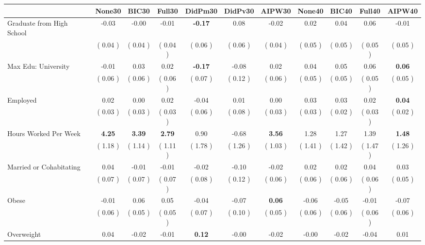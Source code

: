 \begin{tabular}{l c c c c c c c c c c}
\toprule
 & None30 & BIC30 & Full30 & DidPm30 & DidPv30 & AIPW30 & None40 & BIC40 & Full40 & AIPW40 \\
\midrule
Graduate from High School &     -0.03 &     -0.00 &     -0.01 & \textbf{     -0.17 } &      0.08 &     -0.02 &      0.02 &      0.04 &      0.06 &     -0.01 \\
& (     0.04 ) & (     0.04 ) & (     0.04 ) & (     0.06 ) & (     0.06 ) & (     0.04 ) & (     0.05 ) & (     0.05 ) & (     0.05 ) & (     0.05 ) \\
Max Edu: University &     -0.01 &      0.03 &      0.02 & \textbf{     -0.17 } &     -0.08 &      0.02 &      0.04 &      0.05 &      0.06 & \textbf{     0.06} \\
& (     0.06 ) & (     0.06 ) & (     0.06 ) & (     0.07 ) & (     0.12 ) & (     0.06 ) & (     0.05 ) & (     0.05 ) & (     0.05 ) & (     0.05 ) \\
Employed &      0.02 &      0.00 &      0.02 &     -0.04 &      0.01 &      0.00 &      0.03 &      0.03 &      0.02 & \textbf{     0.04} \\
& (     0.03 ) & (     0.03 ) & (     0.03 ) & (     0.06 ) & (     0.08 ) & (     0.03 ) & (     0.03 ) & (     0.02 ) & (     0.03 ) & (     0.02 ) \\
Hours Worked Per Week & \textbf{      4.25 } & \textbf{      3.39 } & \textbf{      2.79 } &      0.90 &     -0.68 & \textbf{     3.56} &      1.28 &      1.27 &      1.39 & \textbf{     1.48} \\
& (     1.18 ) & (     1.14 ) & (     1.11 ) & (     1.78 ) & (     1.26 ) & (     1.03 ) & (     1.41 ) & (     1.42 ) & (     1.47 ) & (     1.26 ) \\
Married or Cohabitating &      0.04 &     -0.01 &     -0.01 &     -0.02 &     -0.10 &     -0.02 &      0.02 &      0.02 &      0.04 &      0.03 \\
& (     0.07 ) & (     0.07 ) & (     0.07 ) & (     0.08 ) & (     0.12 ) & (     0.06 ) & (     0.06 ) & (     0.06 ) & (     0.06 ) & (     0.05 ) \\
Obese &     -0.01 &      0.06 &      0.05 &     -0.04 &     -0.07 & \textbf{     0.06} &     -0.06 &     -0.05 &     -0.01 &     -0.07 \\
& (     0.06 ) & (     0.05 ) & (     0.05 ) & (     0.07 ) & (     0.10 ) & (     0.05 ) & (     0.06 ) & (     0.06 ) & (     0.06 ) & (     0.06 ) \\
Overweight &      0.04 &     -0.02 &     -0.01 & \textbf{      0.12 } &     -0.00 &     -0.02 &     -0.00 &     -0.02 &     -0.04 &      0.01 \\

\end{tabular}
